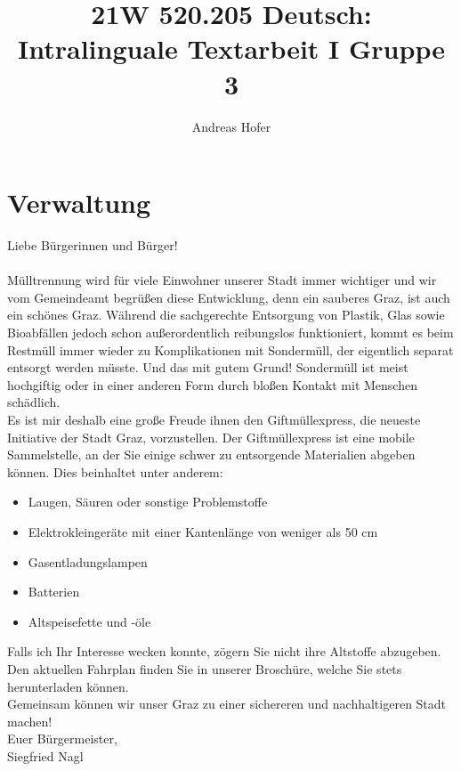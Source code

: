 \documentclass{article}
\title{21W 520.205 Deutsch: Intralinguale Textarbeit I Gruppe 3}
\author{Andreas Hofer}
\begin{document}
	\section*{Verwaltung}
	Liebe Bürgerinnen und Bürger! \\ \\
	Mülltrennung wird für viele Einwohner unserer Stadt immer wichtiger und wir vom Gemeindeamt begrüßen diese Entwicklung, denn ein sauberes Graz, ist auch ein schönes Graz. Während die sachgerechte Entsorgung von Plastik, Glas sowie Bioabfällen jedoch schon außerordentlich reibungslos funktioniert, kommt es beim Restmüll immer wieder zu Komplikationen mit Sondermüll, der eigentlich separat entsorgt werden müsste. Und das mit gutem Grund! Sondermüll ist meist hochgiftig oder in einer anderen Form durch bloßen Kontakt mit Menschen schädlich. \\
	Es ist mir deshalb eine große Freude ihnen den Giftmüllexpress, die neueste Initiative der Stadt Graz, vorzustellen. Der Giftmüllexpress ist eine mobile Sammelstelle, an der Sie einige schwer zu entsorgende Materialien abgeben können. Dies beinhaltet unter anderem:
	\begin{itemize}
		\item{Laugen, Säuren oder sonstige Problemstoffe}
		\item{Elektrokleingeräte mit einer Kantenlänge von weniger als 50 cm}
		\item{Gasentladungslampen}
		\item{Batterien}
		\item{Altspeisefette und -öle}
	\end{itemize}
	Falls ich Ihr Interesse wecken konnte, zögern Sie nicht ihre Altstoffe abzugeben. Den aktuellen Fahrplan finden Sie in unserer Broschüre, welche Sie stets \href{https://www.umweltservice.graz.at/infos/abfall/Giftmuellexpress.pdf}{} herunterladen können. \\

	Gemeinsam können wir unser Graz zu einer sichereren und nachhaltigeren Stadt machen! \\

	Euer Bürgermeister, \\

	Siegfried Nagl
\end{document}
